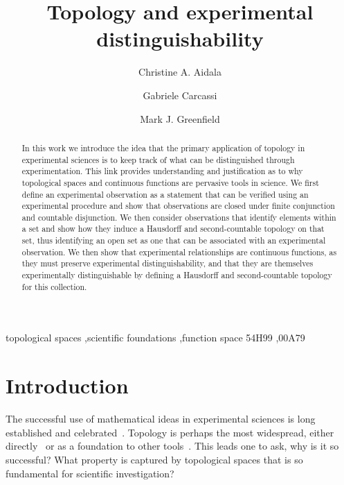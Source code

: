 \documentclass[preprint]{elsarticle}
\theoremstyle{plain}%
\theoremstyle{definition}
\theoremstyle{remark}
\begin{document}
\begin{frontmatter}

\title{Topology and experimental distinguishability}


\author[]{Christine A. Aidala}

\author[]{Gabriele Carcassi}

\author[]{Mark J. Greenfield}

\address{University of Michigan, Ann Arbor, MI 48109, USA}



\begin{abstract}
	In this work we introduce the idea that the primary application of topology in experimental sciences is to keep track of what can be distinguished through experimentation. This link provides understanding and justification as to why topological spaces and continuous functions are pervasive tools in science. We first define an experimental observation as a statement that can be verified using an experimental procedure and show that observations are closed under finite conjunction and countable disjunction. We then consider observations that identify elements within a set and show how they induce a Hausdorff and second-countable topology on that set, thus identifying an open set as one that can be associated with an experimental observation. We then show that experimental relationships are continuous functions, as they must preserve experimental distinguishability, and that they are themselves experimentally distinguishable by defining a Hausdorff and second-countable topology for this collection. 
\end{abstract}

\begin{keyword}
topological spaces \sep scientific foundations \sep function space
\MSC[2010] 54H99 \sep 00A79
\end{keyword}

\end{frontmatter}

\linenumbers

\section{Introduction}

The successful use of mathematical ideas in experimental sciences is long established and celebrated~\cite{wigner}. Topology is perhaps the most widespread, either directly~\cite{rashevsky, chichilnisky} or as a foundation to other tools~\cite{nakahara, basener}.  This leads one to ask, why is it so successful? What property is captured by topological spaces that is so fundamental for scientific investigation?
\end{document}
